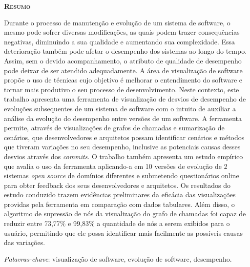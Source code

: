 \begin{center}
	{\Large{\textbf{\mscThesisTitle}}}
\end{center}

\vspace{1cm}


\vspace{1cm}

\begin{center}
	\Large{\textsc{\textbf{Resumo}}}
\end{center}

\noindent Durante o processo de manutenção e evolução de um sistema de software, o mesmo pode sofrer diversas modificações, as quais podem trazer consequências negativas, diminuindo a sua qualidade e aumentando sua complexidade. Essa deterioração também pode afetar o desempenho dos sistemas ao longo do tempo. Assim, sem o devido acompanhamento, o atributo de qualidade de desempenho pode deixar de ser atendido adequadamente. A área de visualização de software propõe o uso de técnicas cujo objetivo é melhorar o entendimento do software e tornar mais produtivo o seu processo de desenvolvimento. Neste contexto, este trabalho apresenta uma ferramenta de visualização de desvios de desempenho de evoluções subsequentes de um sistema de software com o intuito de auxiliar a análise da evolução do desempenho entre versões de um software. A ferramenta permite, através de visualizações de grafos de chamadas e sumarização de cenários, que desenvolvedores e arquitetos possam identificar cenários e métodos que tiveram variações no seu desempenho, inclusive as potenciais causas desses desvios através dos \textit{commits}. O trabalho também apresenta um estudo empírico que avalia o uso da ferramenta aplicando-a em 10 versões de evolução de 2 sistemas \textit{open source} de domínios diferentes e submetendo questionários online para obter feedback dos seus desenvolvedores e arquitetos. Os resultados do estudo conduzido trazem evidências preliminares da eficácia das visualizações providas pela ferramenta em comparação com dados tabulares. Além disso, o algoritmo de supressão de nós da visualização do grafo de chamadas foi capaz de reduzir entre 73,77\% e 99,83\% a quantidade de nós a serem exibidos para o usuário, permitindo que ele possa identificar mais facilmente as possíveis causas das variações.

\noindent\textit{Palavras-chave}: visualização de software, evolução de software, desempenho.